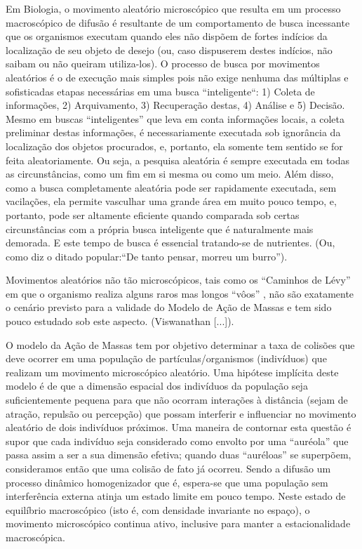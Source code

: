    Em Biologia, o movimento aleatório microscópico que resulta em um processo macroscópico de difusão é resultante de um comportamento de busca incessante que os organismos executam quando eles não dispõem de fortes indícios da localização de seu objeto de desejo (ou, caso dispuserem destes indícios, não saibam ou não queiram utiliza-los). O processo de busca por movimentos aleatórios é o de execução mais simples pois não exige nenhuma das múltiplas e sofisticadas etapas necessárias em uma busca ``inteligente``: 1) Coleta de informações, 2) Arquivamento, 3) Recuperação destas, 4) Análise e 5) Decisão. Mesmo em buscas ``inteligentes'' que leva em conta informações locais, a coleta preliminar destas informações, é necessariamente executada sob ignorância da localização dos objetos procurados, e, portanto, ela somente tem sentido se for feita aleatoriamente. Ou seja, a pesquisa aleatória é sempre executada em todas as circunstâncias, como um fim em si mesma ou como um meio. Além disso, como a busca completamente aleatória pode ser rapidamente executada, sem vacilações, ela permite vasculhar uma grande área em muito pouco tempo, e, portanto, pode ser altamente eficiente quando comparada sob certas circunstâncias com a própria busca inteligente que é naturalmente mais demorada. E este tempo de busca é essencial tratando-se de nutrientes. (Ou, como diz o ditado popular:``De tanto pensar, morreu um burro'').

    Movimentos aleatórios não tão microscópicos, tais como os ``Caminhos de Lévy'' em que o organismo realiza alguns raros mas longos ``vôos'' , não são exatamente o cenário previsto para a validade do Modelo de Ação de Massas e tem sido pouco estudado sob este aspecto. (Viswanathan [...]).

    O modelo da Ação de Massas tem por objetivo determinar a taxa de colisões que deve ocorrer em uma população de partículas/organismos (indivíduos) que realizam um movimento microscópico aleatório. Uma hipótese implícita deste modelo é de que a dimensão espacial dos indivíduos da população seja suficientemente pequena para que não ocorram interações à distância (sejam de atração, repulsão ou percepção) que possam interferir e influenciar no movimento aleatório de dois indivíduos próximos. Uma maneira de contornar esta questão é supor que cada indivíduo seja considerado como envolto por uma ``auréola'' que passa assim a ser a sua dimensão efetiva; quando duas ``auréloas'' se superpõem, consideramos então que uma colisão de fato já ocorreu. Sendo a difusão um processo dinâmico homogenizador que é, espera-se que uma população sem interferência externa atinja um estado limite em pouco tempo. Neste estado de equilíbrio macroscópico (isto é, com densidade invariante no espaço), o movimento microscópico continua ativo, inclusive para manter a estacionalidade macroscópica.

